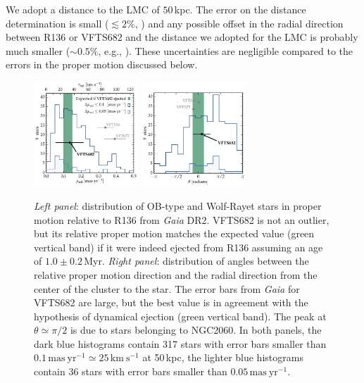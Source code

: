 \documentclass[a4paper,fleqn,usenatbib]{mnras}
\newcommand{\kms}{{\,\mathrm{km\ s^{-1}}}}
\begin{document}
We adopt a distance to the LMC of $50$\,kpc. The error on
the distance determination is small ($\lesssim2\%$,
\citealt{pietrzynski:13}) and any possible offset in the radial
direction between R136 or VFTS682 and the distance we adopted for the
LMC is probably much smaller ($\sim$$0.5\%$, e.g., \citealt{luks:92}). These uncertainties are negligible compared to the errors in the proper motion discussed below.  


\vspace*{10pt}%
\begin{figure}[tbp]
  \centering
  \includegraphics[width=0.35\textwidth]{figures/dist_mu_region.pdf}
  \includegraphics[width=0.35\textwidth]{figures/angle}
  \caption{\emph{Left panel}: distribution of OB-type and Wolf-Rayet stars in proper
    motion relative to R136 from \emph{Gaia} DR2. VFTS682 is not an outlier, but
    its relative proper motion matches the expected value (green
    vertical band) if it were indeed
    ejected from R136 assuming an age of $1.0\pm0.2$\,Myr. %
    \emph{Right panel}:  distribution of
    angles between the relative proper motion direction and the radial
    direction from the center of the cluster to the star. The error bars from \emph{Gaia} for VFTS682 are large, but
    the best value is in agreement with the hypothesis of dynamical
    ejection (green vertical band). The peak at $\theta\simeq\pi/2$ is due to stars
    belonging to NGC2060. In both
    panels, the dark blue histograms contain 317 
    stars with error bars smaller than $0.1\,\mathrm{mas \
      yr^{-1}}\simeq25\,\mathrm{km\ s^{-1}}$ at 50\,kpc, the
    lighter blue histograms contain 36 stars with error bars smaller than $0.05\,\mathrm{mas \
      yr^{-1}}$. }
  \label{fig:dist}
\end{figure}
\end{document}
